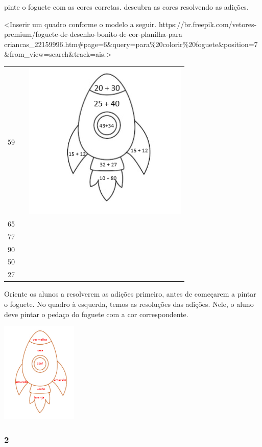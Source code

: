 pinte o foguete com as cores corretas. descubra as cores resolvendo as
adições.

\textless{}Inserir um quadro conforme o modelo a seguir.
https://br.freepik.com/vetores-premium/foguete-de-desenho-bonito-de-cor-planilha-para
criancas\_22159996.htm\#page=6\&query=para\%20colorir\%20foguete\&position=7\&from\_view=search\&track=ais.\textgreater{}

\begin{longtable}[]{@{}lll@{}}
\toprule
59 & &
\includegraphics[width=3.09611in,height=2.97268in]{media/image15.png}\tabularnewline
65 & &\tabularnewline
77 & &\tabularnewline
90 & &\tabularnewline
50 & &\tabularnewline
27 & &\tabularnewline
\bottomrule
\end{longtable}

Oriente os alunos a resolverem as adições primeiro, antes
de começarem a pintar o foguete. No quadro à esquerda, temos as
resoluções das adições. Nele, o aluno deve pintar o pedaço do foguete com
a cor correspondente.

\includegraphics[width=1.43098in,height=1.89472in]{media/image16.png}

\subsubsection{2}\label{section-9}

